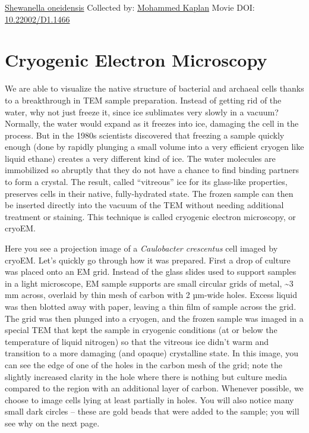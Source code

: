 \documentclass[]{tufte-book}
\begin{document}
\hypertarget{htmlwidget-a4326273bb1442f7903c}{}

\label{fig:1-4}\protect\hyperlink{tree}{Shewanella oneidensis} Collected by: \protect\hyperlink{mohammed_kaplan}{Mohammed Kaplan} Movie DOI: \href{https://doi.org/10.22002/D1.1466}{10.22002/D1.1466}

\hypertarget{cryogenic-electron-microscopy}{%
\section{Cryogenic Electron Microscopy}\label{cryogenic-electron-microscopy}}

We are able to visualize the native structure of bacterial and archaeal cells thanks to a breakthrough in TEM sample preparation. Instead of getting rid of the water, why not just freeze it, since ice sublimates very slowly in a vacuum? Normally, the water would expand as it freezes into ice, damaging the cell in the process. But in the 1980s scientists discovered that freezing a sample quickly enough (done by rapidly plunging a small volume into a very efficient cryogen like liquid ethane) creates a very different kind of ice. The water molecules are immobilized so abruptly that they do not have a chance to find binding partners to form a crystal. The result, called ``vitreous'' ice for its glass-like properties, preserves cells in their native, fully-hydrated state. The frozen sample can then be inserted directly into the vacuum of the TEM without needing additional treatment or staining. This technique is called cryogenic electron microscopy, or cryoEM.

Here you see a projection image of a \emph{Caulobacter crescentus} cell imaged by cryoEM. Let's quickly go through how it was prepared. First a drop of culture was placed onto an EM grid. Instead of the glass slides used to support samples in a light microscope, EM sample supports are small circular grids of metal, \textasciitilde{}3 mm across, overlaid by thin mesh of carbon with 2 µm-wide holes. Excess liquid was then blotted away with paper, leaving a thin film of sample across the grid. The grid was then plunged into a cryogen, and the frozen sample was imaged in a special TEM that kept the sample in cryogenic conditions (at or below the temperature of liquid nitrogen) so that the vitreous ice didn't warm and transition to a more damaging (and opaque) crystalline state. In this image, you can see the edge of one of the holes in the carbon mesh of the grid; note the slightly increased clarity in the hole where there is nothing but culture media compared to the region with an additional layer of carbon. Whenever possible, we choose to image cells lying at least partially in holes. You will also notice many small dark circles -- these are gold beads that were added to the sample; you will see why on the next page.
\end{document}
